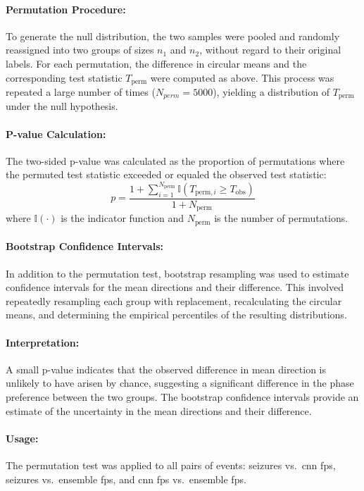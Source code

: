 \paragraph{Permutation Procedure:}
To generate the null distribution, the two samples were pooled and randomly reassigned into two groups of sizes $n_1$ and $n_2$, without regard to their original labels.
For each permutation, the difference in circular means and the corresponding test statistic $T_{\text{perm}}$ were computed as above.
This process was repeated a large number of times ($N_{perm}=5000$), yielding a distribution of $T_{\text{perm}}$ under the null hypothesis.

\paragraph{P-value Calculation:}
The two-sided p-value was calculated as the proportion of permutations where the permuted test statistic exceeded or equaled the observed test statistic:
\begin{equation} \label{eq:circ-pval}
    p = \frac{1 + \sum_{i=1}^{N_{\text{perm}}} \mathbb{I}(T_{\text{perm},i} \geq T_{\text{obs}})}{1 + N_{\text{perm}}}
\end{equation}
where $\mathbb{I}(\cdot)$ is the indicator function and $N_{\text{perm}}$ is the number of permutations.

\paragraph{Bootstrap Confidence Intervals:}
In addition to the permutation test, bootstrap resampling was used to estimate confidence intervals for the mean directions and their difference.
This involved repeatedly resampling each group with replacement, recalculating the circular means, and determining the empirical percentiles of the resulting distributions.

\paragraph{Interpretation:}
A small p-value indicates that the observed difference in mean direction is unlikely to have arisen by chance, suggesting a significant difference in the phase preference between the two groups.
The bootstrap confidence intervals provide an estimate of the uncertainty in the mean directions and their difference.

\paragraph{Usage:} The permutation test was applied to all pairs of events: seizures vs.\ \gls{cnn} \glspl{fp}, seizures vs.\ ensemble \glspl{fp}, and \gls{cnn} \glspl{fp} vs.\ ensemble \glspl{fp}.

